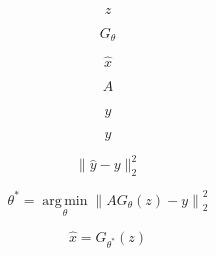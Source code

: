 \[z\]

\[G_{\theta}\]

\[\hat{x}\]

\[A\]

\[\hat{y}\]

\[y\]

\[\lVert\hat{y}-y\rVert_{2}^{2}\]

\[\theta^{\ast}=\operatorname*{arg\,min}_{\theta}\left\lVert A G_{\theta}(z)-y\right\rVert_{2}^{2}\]

\[\hat{x}=G_{\theta^{\ast}}(z)\]
